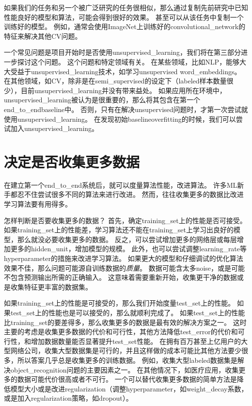 如果我们的任务和另一个被广泛研究的任务很相似，那么通过复制先前研究中已知性能良好的模型和算法，可能会得到很好的效果。
甚至可以从该任务中复制一个训练好的模型。
例如，通常会使用ImageNet上训练好的\gls{convolutional_network}的特征来解决其他\gls{CV}问题\citep{girshickregion}。


一个常见问题是项目开始时是否使用\gls{unsupervised_learning}，我们将在第三部分进一步探讨这个问题。
 这个问题和特定领域有关。
在某些领域，比如\gls{NLP}，能够大大受益于\gls{unsupervised_learning}技术，如学习\gls{unsupervised} \gls{word_embeddings}。
在其他领域，如\gls{CV}，除非是在\gls{semi_supervised}的设定下（\gls{labeled}样本数量很少）\citep{Kingma-et-al-NIPS2014,Rasmus-et-al-arxiv2015}，目前\gls{unsupervised_learning}并没有带来益处。
如果应用所在环境中，\gls{unsupervised_learning}被认为是很重要的，那么将其包含在第一个\gls{end_to_end}\gls{baseline}中。
否则，只有在解决\gls{unsupervised}问题时，才第一次尝试就使用\gls{unsupervised_learning}。
在发现初始\gls{baseline}\gls{overfitting}的时候，我们可以尝试加入\gls{unsupervised_learning}。


\section{决定是否收集更多数据}
\label{sec:determining_whether_to_gather_more_data}

在建立第一个\gls{end_to_end}系统后，就可以度量算法性能，改进算法。
许多\gls{ML}新手都忍不住尝试很多不同的算法来进行改进。
然而，往往收集更多的数据比改进学习算法要有用得多。


怎样判断是否要收集更多的数据？
首先，确定\gls{training_set}上的性能是否可接受。
如果\gls{training_set}上的性能差，学习算法还不能在\gls{training_set}上学习出良好的模型，那么就没必要收集更多的数据。
反之，可以尝试增加更多的网络层或每层增加更多的\gls{hidden_unit}，增加模型的规模。
此外，也可以尝试调整\gls{learning_rate}等\gls{hyperparameter}的措施来改进学习算法。
如果更大的模型和仔细调试的优化算法效果不佳，那么问题可能源自训练数据的\emph{质量}。
数据可能含太多\gls{noise}，或是可能不包含预测输出所需的正确输入。
这意味着需要重新开始，收集更干净的数据或是收集特征更丰富的数据集。


如果\gls{training_set}上的性能是可接受的，那么我们开始度量\gls{test_set}上的性能。
如果\gls{test_set}上的性能也是可以接受的，那么就顺利完成了。
如果\gls{test_set}上的性能比\gls{training_set}的要差得多，那么收集更多的数据是最有效的解决方案之一。
这时主要的考虑是收集更多数据的代价和可行性，其他方法降低\gls{test_error}的代价和可行性，和增加数据数量能否显著提升\gls{test_set}性能。
在拥有百万甚至上亿用户的大型网络公司，收集大型数据集是可行的，并且这样做的成本可能比其他方法要少很多，所以答案几乎总是收集更多的训练数据。
例如，收集大型\gls{labeled}数据集是解决\gls{object_recognition}问题的主要因素之一。
在其他情况下，如医疗应用，收集更多的数据可能代价很高或者不可行。
一个可以替代收集更多数据的简单方法是降低模型大小或是改进\gls{regularization}（调整\gls{hyperparameter}，如\gls{weight_decay}系数，或是加入\gls{regularization}策略，如\gls{dropout}）。%


